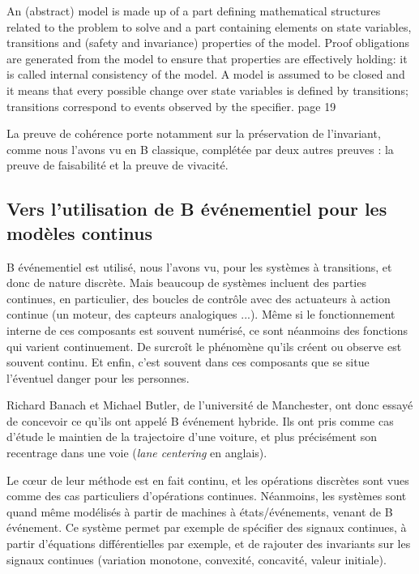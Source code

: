 \documentclass[10pt,a4paper]{article}
\begin{document}
{An (abstract) model is made up of a part defining mathematical structures
related to the problem to solve and a part containing elements on state variables,
transitions and (safety and invariance) properties of the model. Proof obligations
are generated from the model to ensure that properties are effectively holding: it
is called internal consistency of the model. A model is assumed to be closed and
it means that every possible change over state variables is defined by transitions;
transitions correspond to events observed by the specifier.
page 19


La preuve de cohérence porte
notamment sur la préservation de l'invariant, comme nous l’avons
vu en B classique, complétée par deux autres preuves : la preuve
de faisabilité et la preuve de vivacité.\cite{dossierTechnique}
\fi

\subsection{Vers l'utilisation de B événementiel pour les modèles continus}

B événementiel est utilisé, nous l'avons vu, pour les systèmes à transitions, et donc de nature discrète. Mais beaucoup de systèmes incluent des parties continues, en particulier, des boucles de contrôle avec des actuateurs à action continue (un moteur, des capteurs analogiques ...). Même si le fonctionnement interne de ces composants est souvent numérisé, ce sont néanmoins des fonctions qui varient continuement. De surcroît le phénomène qu'ils créent ou observe est souvent continu. Et enfin, c'est souvent dans ces composants que se situe l'éventuel danger pour les personnes.

Richard Banach et Michael Butler, de l'université de Manchester, ont donc essayé de concevoir ce qu'ils ont appelé \og B événement hybride\fg \cite{hevB}. Ils ont pris comme cas d'étude le maintien de la trajectoire d'une voiture, et plus précisément son recentrage dans une voie (\textit{lane centering} en anglais).

Le cœur de leur méthode est en fait continu, et les opérations discrètes sont vues comme des cas particuliers d'opérations continues. Néanmoins, les systèmes sont quand même modélisés à partir de machines à états/événements, venant de B événement. Ce système permet par exemple de spécifier des signaux continues, à partir d'équations différentielles par exemple, et de rajouter des invariants sur les signaux continues (variation monotone, convexité, concavité, valeur initiale).

}
\end{document}
